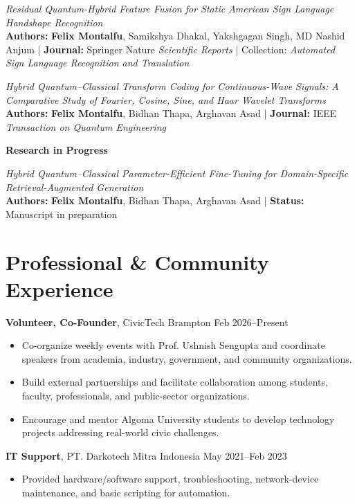 \documentclass[a4paper,10pt]{article}
\begin{document}
\textit{Residual Quantum-Hybrid Feature Fusion for Static American Sign Language Handshape Recognition} \\
\textbf{Authors:} \textbf{Felix Montalfu}, Samikshya Dhakal,
Yakshgagan Singh, MD Nashid Anjum \;|\;
\textbf{Journal:} Springer Nature \textit{Scientific Reports} \;|\;
Collection: \textit{Automated Sign Language Recognition and Translation}

\textit{Hybrid Quantum--Classical Transform Coding for Continuous-Wave Signals:
A Comparative Study of Fourier, Cosine, Sine, and Haar Wavelet Transforms} \\
\textbf{Authors:} \textbf{Felix Montalfu}, Bidhan Thapa, Arghavan Asad
\;|\; \textbf{Journal:} IEEE \textit{Transaction on Quantum Engineering}

\textbf{Research in Progress}

\textit{Hybrid Quantum--Classical Parameter-Efficient Fine-Tuning for
Domain-Specific Retrieval-Augmented Generation} \\
\textbf{Authors:} \textbf{Felix Montalfu}, Bidhan Thapa, Arghavan Asad
\;|\; \textbf{Status:} Manuscript in preparation


\section*{Professional \& Community Experience}

\textbf{Volunteer, Co-Founder}, CivicTech Brampton
\hfill Feb 2026--Present
\begin{itemize}
    \item Co-organize weekly events with Prof. Ushnish Sengupta and coordinate
    speakers from academia, industry, government, and community organizations.
    \item Build external partnerships and facilitate collaboration among
    students, faculty, professionals, and public-sector organizations.
    \item Encourage and mentor Algoma University students to develop
    technology projects addressing real-world civic challenges.
\end{itemize}

\textbf{IT Support}, PT. Darkotech Mitra Indonesia
\hfill May 2021--Feb 2023
\begin{itemize}
    \item Provided hardware/software support, troubleshooting, network-device
    maintenance, and basic scripting for automation.
\end{itemize}
\end{document}
